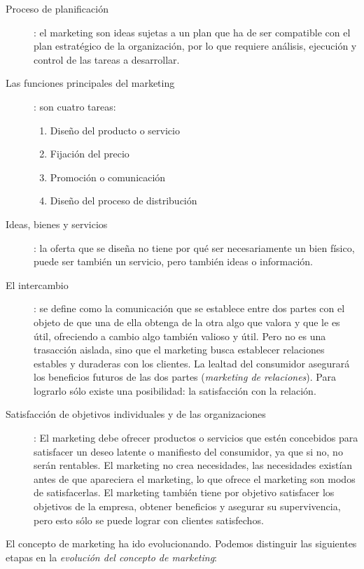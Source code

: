 \documentclass[10pt,a4paper,spanish]{report}
\begin{document}
		\begin{description}
			\item[Proceso de planificación]: el marketing son ideas sujetas a un plan que ha de ser compatible con el plan estratégico de la organización, por lo que requiere análisis, ejecución y control de las tareas a desarrollar.

			\item[Las funciones principales del marketing]: son cuatro tareas:
			\begin{enumerate}
				\item Diseño del producto o servicio
				\item Fijación del precio
				\item Promoción o comunicación
				\item Diseño del proceso de distribución
			\end{enumerate}

			\item[Ideas, bienes y servicios]: la oferta que se diseña no tiene por qué ser necesariamente un bien físico, puede ser también un servicio, pero también ideas o información.

			\item[El intercambio]: se define como la comunicación que se establece entre dos partes con el objeto de que una de ella obtenga de la otra algo que valora y que le es útil, ofreciendo a cambio algo también valioso y útil. Pero no es una trasacción aislada, sino que el marketing busca establecer relaciones estables y duraderas con los clientes. La lealtad del consumidor asegurará los beneficios futuros de las dos partes (\textit{\textcolor[rgb]{0.1,0.2,0.4}{marketing de relaciones}}). Para lograrlo sólo existe una posibilidad: la satisfacción con la relación.

			\item[Satisfacción de objetivos individuales y de las organizaciones]: El marketing debe ofrecer productos o servicios que estén concebidos para satisfacer un deseo latente o manifiesto del consumidor, ya que si no, no serán rentables. El marketing no crea necesidades, las necesidades existían antes de que apareciera el marketing, lo que ofrece el marketing son modos de satisfacerlas. El marketing también tiene por objetivo satisfacer los objetivos de la empresa, obtener beneficios y asegurar su supervivencia, pero esto sólo se puede lograr con clientes satisfechos.
		\end{description}

		El concepto de marketing ha ido evolucionando. Podemos distinguir las siguientes etapas en la \textit{\textcolor[rgb]{0.1,0.2,0.4}{evolución del concepto de marketing}}:
\end{document}
